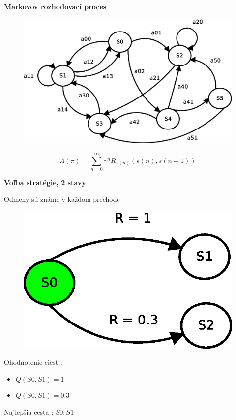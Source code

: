 \documentclass[xcolor=dvipsnames]{beamer}
\begin{document}
\begin{frame}{\bf Markovov rozhodovací proces}

  \begin{figure}[!htb]
  \centering
  \includegraphics[scale=.3]{../diagrams/markovov_process.eps}
  \end{figure}

  \begin{equation*}
  \Lambda(\pi)  = \sum\limits_{n=0}^{\infty}\gamma^n R_{\pi(n)}(s(n), s(n-1))
  \label{eq:q_quality}
  \end{equation*}

\end{frame}


\begin{frame}{\bf Voľba stratégie, 2 stavy}

  Odmeny sú známe v každom prechode

  \begin{figure}[!htb]
  \centering
  \includegraphics[scale=.6]{../diagrams/rf_two_states.eps}
  \end{figure}

  Ohodnotenie ciest :
  \begin{itemize}
    \item $Q(S0, S1) = 1$
    \item $Q(S0, S1) = 0.3$
  \end{itemize}

  Najlepšia cesta : $S0, S1$
\end{frame}
\end{document}
